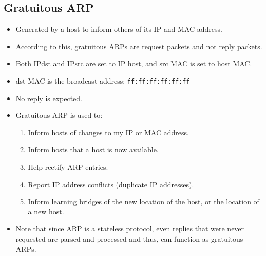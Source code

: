 \documentclass{report}
\begin{document}
\subsection{Gratuitous ARP}
\begin{itemize}
\item Generated by a host to inform others of its IP and MAC address.
\item According to \href{https://networkengineering.stackexchange.com/questions/7713/how-does-gratuitous-arp-work}{this,} gratuitous ARPs are request packets and not reply packets.
\item Both IPdst and IPsrc are set to IP host, and src MAC is set to host MAC.
\item dst MAC is the broadcast address: \texttt{ff:ff:ff:ff:ff:ff}
\item No reply is expected.
\item Gratuitous ARP is used to:
\begin{enumerate}
\item Inform hosts of changes to my IP or MAC address.
\item Inform hosts that a host is now available.
\item Help rectify ARP entries.
\item Report IP address conflicts (duplicate IP addresses).
\item Inform learning bridges of the new location of the host, or the location of a new host.
\end{enumerate}
\item Note that since ARP is a stateless protocol, even replies that were never requested are parsed and processed and thus, can function as gratuitous ARPs.
\end{itemize}
\end{document}
